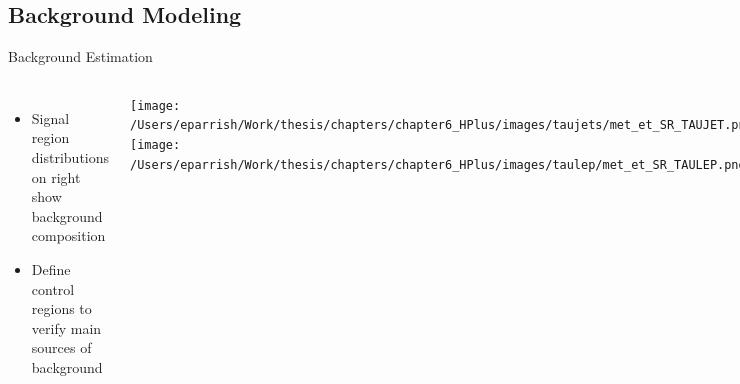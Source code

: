 \documentclass[aspectratio=169,xcolor=table]{beamer}
\begin{document}
  \subsection{ Background Modeling }
  \begin{frame}[t]{Background Estimation}
    \begin{columns}[t]
      \vspace{-3.5cm}
        \begin{itemize}
          \item Signal region \Etm distributions on right show background composition
          \item Define control regions to verify main sources of background
        \end{itemize}


      \centering
      \texttt{[image: /Users/eparrish/Work/thesis/chapters/chapter6\_HPlus/images/taujets/met\_et\_SR\_TAUJET.png]}
      \texttt{[image: /Users/eparrish/Work/thesis/chapters/chapter6\_HPlus/images/taulep/met\_et\_SR\_TAULEP.png]}
    \end{columns}
  \end{frame}
\end{document}
